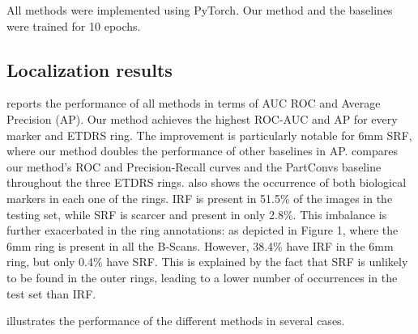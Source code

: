 All methods were implemented using PyTorch. Our method and the baselines were trained for 10 epochs.

\subsection{Localization results}

 reports the performance of all methods in terms of AUC ROC and Average Precision (AP). Our method achieves the highest ROC-AUC and AP for every marker and ETDRS ring. The improvement is particularly notable for 6mm SRF, where our method doubles the performance of other baselines in AP.  compares our method's ROC and Precision-Recall curves and the PartConvs baseline throughout the three ETDRS rings.  also shows the occurrence of both biological markers in each one of the rings. IRF is present in 51.5\% of the images in the testing set, while SRF is scarcer and present in only 2.8\%. This imbalance is further exacerbated in the ring annotations: as depicted in Figure 1, where the 6mm ring is present in all the B-Scans. However, 38.4\% have IRF in the 6mm ring, but only 0.4\% have SRF. This is explained by the fact that SRF is unlikely to be found in the outer rings, leading to a lower number of occurrences in the test set than IRF. 

\noindent



 illustrates the performance of the different methods in several cases. 



